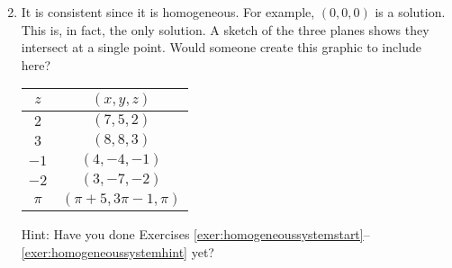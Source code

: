 \begin{enumerate}[!HW!, start=1]
\begin{multicols}{3}
\end{multicols}

\item 
It is consistent since it is homogeneous. For example, $(0,0,0)$ is a solution. This is, in fact, the only solution. A sketch of the three planes shows they intersect at a single point. {\color{red} Would someone create this graphic to include here?}

\begin{multicols}{2}
\itemspade 
\mbox{}
\begin{center}
\begin{tabular}{c|c}
$z$ & $(x,y,z)$\\\hline
$2$ & $(7,5, 2)$\\
$3$ & $(8,8, 3)$\\
$-1$ & $(4, -4, -1)$\\
$-2$ & $(3,-7, -2)$\\
$\pi$ & $(\pi + 5, 3\pi-1, \pi)$\\
\end{tabular}
\end{center} 

\itemspade 
Hint: Have you done Exercises \ref{exer:homogeneoussystemstart}--\ref{exer:homogeneoussystemhint} yet?
\end{multicols}
\end{enumerate}\vs